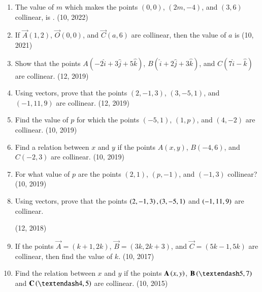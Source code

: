 \begin{enumerate}[label=\thesubsection.\arabic*, ref=\thesubsection.\theenumi]
    \item The value of $m$ which makes the points $(0,0)$, $(2m, -4)$, and $(3,6)$ collinear, is \underline{\hspace{1cm}}.
    \hfill (10, 2022)
		\item If $\vec{A}(1, 2)$, $\vec{O}(0, 0)$, and $\vec{C}(a, 6)$ are collinear, then the value of $a$ is
		\hfill (10, 2021)
	\item Show that the points $A(-2\hat{i} + 3\hat{j} + 5\hat{k})$, $B(\hat{i} + 2\hat{j} + 3\hat{k})$, and $C(7\hat{i} - \hat{k})$ are collinear. \hfill (12, 2019)
	\item Using vectors, prove that the points $(2, -1, 3)$, $(3, -5, 1)$, and $(-1, 11, 9)$ are collinear. \hfill (12, 2019)
\item Find the value of $p$ for which the points $(-5, 1)$, $(1, p)$, and $(4, -2)$ are collinear. \hfill (10, 2019)
\item Find a relation between $x$ and $y$ if the points $A(x, y)$, $B(-4, 6)$, and $C(-2, 3)$ are collinear. \hfill (10, 2019)
\item For what value of $p$ are the points $(2, 1)$, $(p, -1)$, and $(-1, 3)$ collinear? \hfill (10, 2019)
\item Using vectors, prove that the points $\left(2,-1,3\right),\left(3,-5,1\right)$ and $\left(-1,11,9\right)$ are collinear.

\hfill (12, 2018) 
\item If the points $\vec{A} = (k+1, 2k)$, $\vec{B} = (3k, 2k + 3)$, and $\vec{C} = (5k-1, 5k)$ are collinear, then find the value of $k$. \hfill (10, 2017)
\item Find the relation between $x$ and $y$ if the points $\mathbf{A}\left(x,y\right)$, $\vec{B}\brak{–5,7}$ and $\vec{C}\brak{–4, 5}$ are collinear. \hfill (10, 2015)
\end{enumerate}
